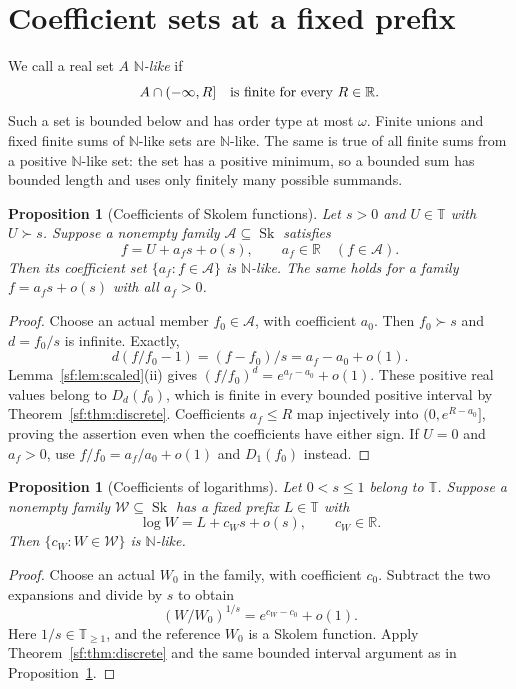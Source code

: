 \documentclass[11pt]{article}
\newtheorem{proposition}[theorem]{Proposition}
\theoremstyle{definition}
\theoremstyle{remark}
\newcommand{\Sk}{\operatorname{Sk}}
\newcommand{\N}{\mathbb N}
\newcommand{\R}{\mathbb R}
\newcommand{\T}{\mathbb T}
\numberwithin{equation}{section}
\begin{document}
\section{Coefficient sets at a fixed prefix}\label{sf:sec:coefficients}

We call a real set \(A\) \emph{\(\N\)-like} if
\begin{equation}
 A\cap(-\infty,R]\quad\hbox{is finite for every }R\in\R.
 \label{f-eq-2.4}
\end{equation}
Such a set is bounded below and has order type at most \(\omega\).
Finite unions and fixed finite sums of \(\N\)-like sets are
\(\N\)-like.  The same is true of all finite sums from a positive
\(\N\)-like set: the set has a positive minimum, so a bounded sum
has bounded length and uses only finitely many possible summands.

\begin{proposition}[Coefficients of Skolem functions]\label{sf:prop:coef}
Let $s>0$ and $U\in\T$ with $U\succ s$. Suppose a nonempty
family $\mathcal A\subseteq\Sk$ satisfies
\[
 f=U+a_f s+o(s),\qquad a_f\in\R\quad(f\in\mathcal A).
\]
Then its coefficient set $\{a_f:f\in\mathcal A\}$ is $\N$-like.
The same holds for a family $f=a_f s+o(s)$ with all $a_f>0$.
\end{proposition}
\begin{proof}
Choose an actual member $f_0\in\mathcal A$, with coefficient
$a_0$. Then $f_0\succ s$ and $d=f_0/s$ is infinite. Exactly,
\[
 d(f/f_0-1)=(f-f_0)/s=a_f-a_0+o(1).
\]
Lemma~\ref{sf:lem:scaled}(ii) gives
$(f/f_0)^d=e^{a_f-a_0}+o(1)$. These positive real values belong
to $D_d(f_0)$, which is finite in every bounded positive interval
by Theorem~\ref{sf:thm:discrete}. Coefficients $a_f\le R$ map
injectively into $(0,e^{R-a_0}]$, proving the assertion even
when the coefficients have either sign. If $U=0$ and $a_f>0$,
use $f/f_0=a_f/a_0+o(1)$ and $D_1(f_0)$ instead.
\end{proof}

\begin{proposition}[Coefficients of logarithms]\label{sf:prop:logcoef}
Let $0<s\le1$ belong to $\T$. Suppose a nonempty family
$\mathcal W\subseteq\Sk$ has a fixed prefix $L\in\T$ with
\[
 \log W=L+c_Ws+o(s),\qquad c_W\in\R.
\]
Then $\{c_W:W\in\mathcal W\}$ is $\N$-like.
\end{proposition}
\begin{proof}
Choose an actual $W_0$ in the family, with coefficient $c_0$.
Subtract the two expansions and divide by $s$ to obtain
\[
 (W/W_0)^{1/s}=e^{c_W-c_0}+o(1).
\]
Here $1/s\in\T_{\ge1}$, and the reference $W_0$ is a Skolem
function. Apply Theorem~\ref{sf:thm:discrete} and the same bounded
interval argument as in Proposition~\ref{sf:prop:coef}.
\end{proof}
\end{document}
